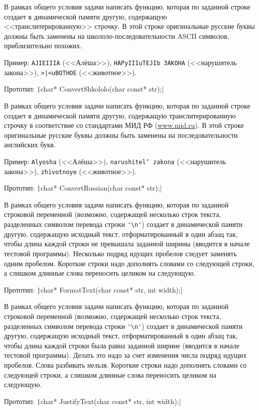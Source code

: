 \begin{zztask}
В рамках общего условия задачи написать функцию, которая по заданной строке
создает в динамической памяти другую, содержащую <<транслитерированную>>
строчку. В этой строке оригинальные русские буквы должны быть заменены на
школоло-последовательности ASCII символов, приблизительно похожих.

Пример:
\verb|AJIEIIIA| (<<Алёша>>), \verb|HAPyIIIuTEJIb 3AKOHA|
(<<нарушитель закона>>), \verb!>|<uBOTHOE! (<<животное>>).

Прототип: \texttt|char* ConvertShkololo(char const* str);|
\end{zztask}

\begin{zztask}
В рамках общего условия задачи написать функцию, которая по заданной строке
создает в динамической памяти другую, содержащую транслитерированную
строчку в соответствие со стандартами МИД РФ (\url{www.mid.ru}).
В этой строке оригинальные русские буквы должны быть заменены на
последовательности английских букв.

Пример:
\texttt{Alyosha} (<<Алёша>>), \texttt{narushitel{'} zakona}
(<<нарушитель закона>>), \texttt{zhivotnoye} (<<животное>>).

Прототип: \texttt|char* ConvertRussian(char const* str);|
\end{zztask}

\begin{zztask}
В рамках общего условия задачи написать функцию, которая по заданной строковой
переменной (возможно, содержащей несколько строк текста, разделенных символом
перевода строки \verb|'\n'|) создает в динамической памяти другую, содержащую
исходный текст, отформатированный в один абзац так, чтобы длина каждой
строки не превышала заданной ширины (вводится в начале тестовой программы).
Несколько подряд идущих пробелов следует заменять одним пробелом.
Короткие строки надо дополнять словами со следующей строки, а слишком
длинные слова переносить целиком на следующую.

Прототип: \texttt|char* FormatText(char const* str, int width);|
\end{zztask}

\begin{zztask}
В рамках общего условия задачи написать функцию, которая по заданной строковой
переменной (возможно, содержащей несколько строк текста, разделенных символом
перевода строки \verb|'\n'|) создает в динамической памяти другую, содержащую
исходный текст, отформатированный в один абзац так, чтобы длина каждой
строки была равна заданной ширине (вводится в начале тестовой программы).
Делать это надо за счет изменения числа подряд идущих пробелов. Слова
разбивать нельзя. Короткие строки надо дополнять словами со следующей
строки, а слишком длинные слова переносить целиком на следующую.

Прототип: \texttt|char* JustifyText(char const* str, int width);|
\end{zztask}
